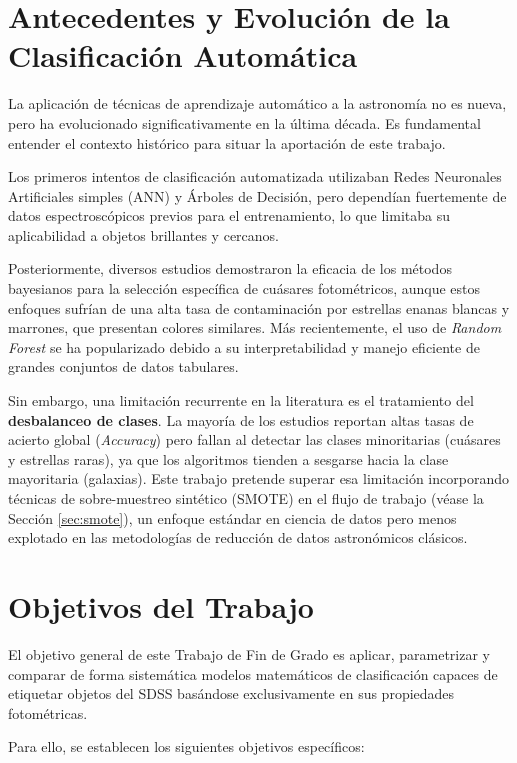 \documentclass[12pt, a4paper]{report}
\begin{document}
\section{Antecedentes y Evolución de la Clasificación Automática}

La aplicación de técnicas de aprendizaje automático a la astronomía no es nueva, pero ha evolucionado significativamente en la última década. Es fundamental entender el contexto histórico para situar la aportación de este trabajo.

Los primeros intentos de clasificación automatizada \citep{ivezic2014} utilizaban Redes Neuronales Artificiales simples (ANN) y Árboles de Decisión, pero dependían fuertemente de datos espectroscópicos previos para el entrenamiento, lo que limitaba su aplicabilidad a objetos brillantes y cercanos.

Posteriormente, diversos estudios demostraron la eficacia de los métodos bayesianos para la selección específica de cuásares fotométricos, aunque estos enfoques sufrían de una alta tasa de contaminación por estrellas enanas blancas y marrones, que presentan colores similares. Más recientemente, el uso de \textit{Random Forest} se ha popularizado debido a su interpretabilidad y manejo eficiente de grandes conjuntos de datos tabulares.

Sin embargo, una limitación recurrente en la literatura es el tratamiento del \textbf{desbalanceo de clases}. La mayoría de los estudios reportan altas tasas de acierto global (\textit{Accuracy}) pero fallan al detectar las clases minoritarias (cuásares y estrellas raras), ya que los algoritmos tienden a sesgarse hacia la clase mayoritaria (galaxias). Este trabajo pretende superar esa limitación incorporando técnicas de sobre-muestreo sintético (SMOTE) en el flujo de trabajo (véase la Sección \ref{sec:smote}), un enfoque estándar en ciencia de datos pero menos explotado en las metodologías de reducción de datos astronómicos clásicos.

\section{Objetivos del Trabajo}

El objetivo general de este Trabajo de Fin de Grado es aplicar, parametrizar y comparar de forma sistemática modelos matemáticos de clasificación capaces de etiquetar objetos del SDSS basándose exclusivamente en sus propiedades fotométricas.

Para ello, se establecen los siguientes objetivos específicos:
\end{document}
